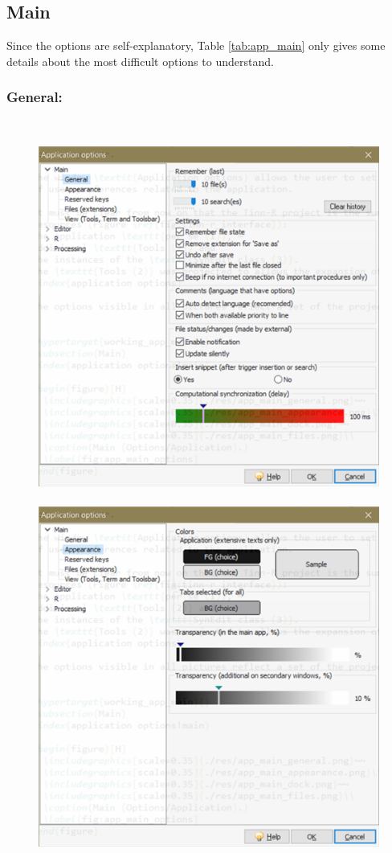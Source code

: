 \subsection{Main}

Since the options are self-explanatory, Table \ref{tab:app_main} only gives some
details about the most difficult options to understand.

\subsubsection{General:}\\

\begin{figure}[H]
  \includegraphics[scale=0.45]{./res/app_main_general.png}~~
  \includegraphics[scale=0.45]{./res/app_main_appearance.png}~~

\end{figure}
